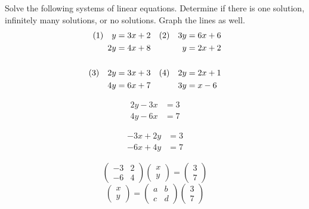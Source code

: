 \documentclass[crop=false,class=book,oneside]{standalone}                      %
\begin{document}
        \newpage
        \begin{problem}
            Solve the following systems of linear equations.
            Determine if there is one solution, infinitely many
            solutions, or no solutions. Graph the lines as well.
            \begin{align*}
                (1)\quad{y}&=3x+2&(2)\quad{3}y&=6x+6\\
                2y&=4x+8&y&=2x+2\\
                \hfill\\
                (3)\quad{2}y&=3x+3&(4)\quad{2}y&=2x+1\\
                4y&=6x+7&3y&=x-6
            \end{align*}
        \end{problem}
        \begin{align*}
            2y-3x&=3\\
            4y-6x&=7
        \end{align*}
        \par\hfill\par
        \begin{align*}
            \minus{3}x+2y&=3\\
            \minus{6}x+4y&=7
        \end{align*}
        \par\hfill\par
        \begin{equation}
            \begin{pmatrix}
                \minus{3}&2\\
                \minus{6}&4
            \end{pmatrix}
            \begin{pmatrix}
                x\\y
            \end{pmatrix}
            =
            \begin{pmatrix}
                3\\7
            \end{pmatrix}
        \end{equation}
        \begin{equation}
            \begin{pmatrix}
                x\\y
            \end{pmatrix}
            =
            \begin{pmatrix}
                a&b\\
                c&d
            \end{pmatrix}
            \begin{pmatrix}
                3\\7
            \end{pmatrix}
        \end{equation}
\end{document}
